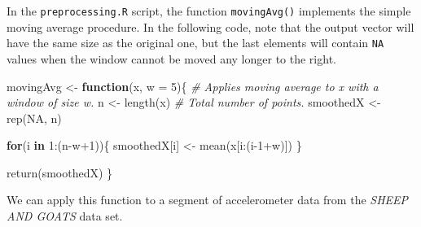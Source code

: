 \documentclass[
  11pt,
]{krantz}
\newenvironment{Shaded}{\begin{snugshade}}{\end{snugshade}}
\newcommand{\AttributeTok}[1]{\textcolor[rgb]{0.61,0.61,0.61}{#1}}
\newcommand{\CommentTok}[1]{\textcolor[rgb]{0.37,0.37,0.37}{\textit{#1}}}
\newcommand{\ConstantTok}[1]{\textcolor[rgb]{0,0,0}{#1}}
\newcommand{\ControlFlowTok}[1]{\textcolor[rgb]{0.27,0.27,0.27}{\textbf{#1}}}
\newcommand{\DecValTok}[1]{\textcolor[rgb]{0.06,0.06,0.06}{#1}}
\newcommand{\FunctionTok}[1]{\textcolor[rgb]{0,0,0}{#1}}
\newcommand{\NormalTok}[1]{#1}
\newcommand{\OtherTok}[1]{\textcolor[rgb]{0.37,0.37,0.37}{#1}}
\newcommand{\SpecialCharTok}[1]{\textcolor[rgb]{0,0,0}{#1}}
\newcommand{\StringTok}[1]{\textcolor[rgb]{0.5,0.5,0.5}{#1}}
\begin{document}
In the \texttt{preprocessing.R} script, the function \texttt{movingAvg()} implements the simple moving average procedure. In the following code, note that the output vector will have the same size as the original one, but the last elements will contain \texttt{NA} values when the window cannot be moved any longer to the right.

\begin{Shaded}
\begin{Highlighting}[]
\NormalTok{movingAvg }\OtherTok{\textless{}{-}} \ControlFlowTok{function}\NormalTok{(x, }\AttributeTok{w =} \DecValTok{5}\NormalTok{)\{}
  \CommentTok{\# Applies moving average to x with a window of size w.}
\NormalTok{  n }\OtherTok{\textless{}{-}} \FunctionTok{length}\NormalTok{(x) }\CommentTok{\# Total number of points.}
\NormalTok{  smoothedX }\OtherTok{\textless{}{-}} \FunctionTok{rep}\NormalTok{(}\ConstantTok{NA}\NormalTok{, n)}
  
  \ControlFlowTok{for}\NormalTok{(i }\ControlFlowTok{in} \DecValTok{1}\SpecialCharTok{:}\NormalTok{(n}\SpecialCharTok{{-}}\NormalTok{w}\SpecialCharTok{+}\DecValTok{1}\NormalTok{))\{}
\NormalTok{    smoothedX[i] }\OtherTok{\textless{}{-}} \FunctionTok{mean}\NormalTok{(x[i}\SpecialCharTok{:}\NormalTok{(i}\DecValTok{{-}1}\SpecialCharTok{+}\NormalTok{w)])}
\NormalTok{  \}}
  
  \FunctionTok{return}\NormalTok{(smoothedX)}
\NormalTok{\}}
\end{Highlighting}
\end{Shaded}

We can apply this function to a segment of accelerometer data from the \emph{SHEEP AND GOATS} data set.

\begin{Shaded}
\end{Shaded}
\end{document}

